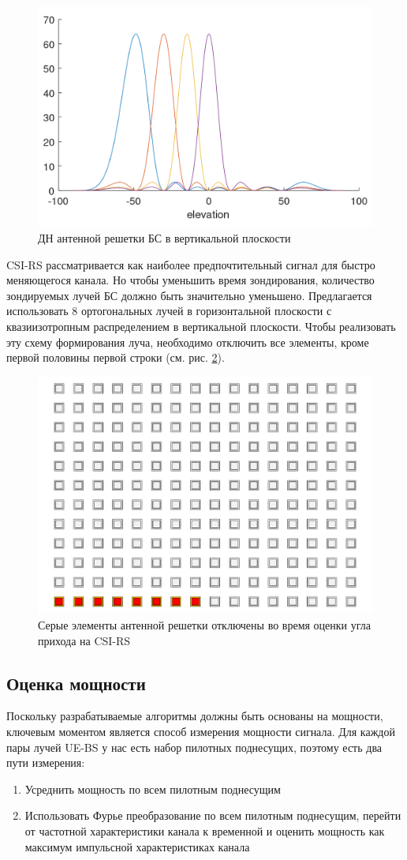 \begin{figure}[h!]
    \centering
    \includegraphics[width=0.5\linewidth]{figs/fig4.6}
    \caption{ДН антенной решетки БС в вертикальной плоскости}
    \label{fig:4.7}
\end{figure}


CSI-RS рассматривается как наиболее предпочтительный сигнал для быстро меняющегося канала. 
Но чтобы уменьшить время зондирования, количество
зондируемых лучей БС должно быть значительно уменьшено. Предлагается
использовать 8 ортогональных лучей в горизонтальной плоскости с квазиизотропным распределением 
в вертикальной плоскости.
Чтобы реализовать эту схему формирования луча, необходимо отключить все
элементы, кроме первой половины первой строки (см. рис. \ref{fig:4.8}).

\begin{figure}[h!]
    \centering
    \includegraphics[width=0.35\linewidth]{figs/fig4.8.pdf}
    \caption{Серые элементы антенной решетки отключены во время оценки угла прихода на CSI-RS}
    \label{fig:4.8}
\end{figure}

\subsection{Оценка мощности}

Поскольку разрабатываемые алгоритмы должны быть основаны на мощности, ключевым
моментом является способ измерения мощности сигнала. Для каждой пары лучей UE-BS
у нас есть набор пилотных поднесущих, поэтому есть два пути измерения:
\begin{enumerate}
    \item Усреднить мощность по всем пилотным поднесущим
    \item Использовать Фурье преобразование по всем пилотным поднесущим, перейти от частотной характеристики канала к временной и оценить мощность как максимум импульсной характеристиках канала
\end{enumerate}


